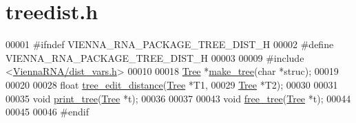 \hypertarget{treedist_8h_source}{}\section{treedist.\+h}
\label{treedist_8h_source}

\begin{DoxyCode}
00001 \textcolor{preprocessor}{#ifndef VIENNA\_RNA\_PACKAGE\_TREE\_DIST\_H}
00002 \textcolor{preprocessor}{#define VIENNA\_RNA\_PACKAGE\_TREE\_DIST\_H}
00003 
00009 \textcolor{preprocessor}{#include <\mbox{\hyperlink{dist__vars_8h}{ViennaRNA/dist\_vars.h}}>}
00010 
00018 \mbox{\hyperlink{struct_tree}{Tree}} *\mbox{\hyperlink{treedist_8h_a08fe4d5afd385dce593b86eaf010c6e3}{make\_tree}}(\textcolor{keywordtype}{char} *struc);
00019 
00020 
00028 \textcolor{keywordtype}{float}   \mbox{\hyperlink{treedist_8h_a3b21f1925f7071f46d93431a835217bb}{tree\_edit\_distance}}(\mbox{\hyperlink{struct_tree}{Tree}} *T1,
00029                            \mbox{\hyperlink{struct_tree}{Tree}} *T2);
00030 
00031 
00035 \textcolor{keywordtype}{void}    \mbox{\hyperlink{treedist_8h_a21ad4de3ba4055aeef08b28c9ad48894}{print\_tree}}(\mbox{\hyperlink{struct_tree}{Tree}} *t);
00036 
00037 
00043 \textcolor{keywordtype}{void}    \mbox{\hyperlink{treedist_8h_acbc1cb9bce582ea945e4a467c76a57aa}{free\_tree}}(\mbox{\hyperlink{struct_tree}{Tree}} *t);
00044 
00045 
00046 \textcolor{preprocessor}{#endif}
\end{DoxyCode}
